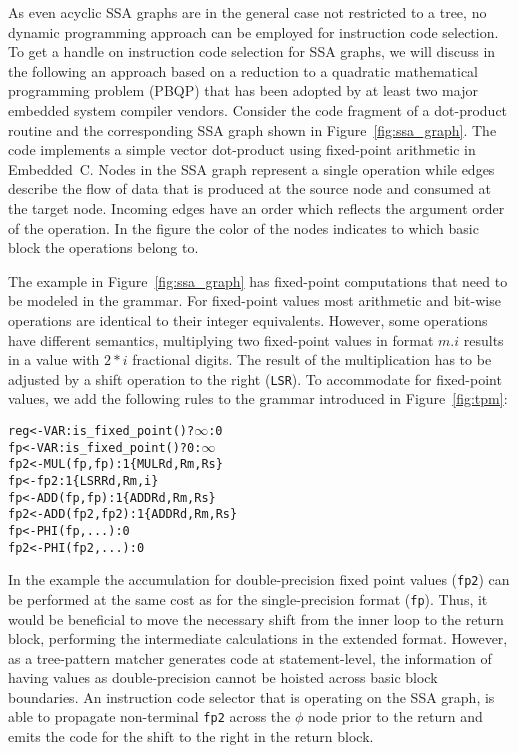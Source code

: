 As even acyclic SSA graphs are in the general case not restricted to a tree, no dynamic programming approach
can be employed for instruction code selection.  To get a handle on instruction code
selection for SSA graphs, we will discuss in the following an approach
based on a reduction to a quadratic mathematical programming problem
(PBQP) that has been adopted by at least two major embedded system
compiler vendors.  Consider the code fragment of a dot-product routine
and the corresponding SSA graph shown in Figure~\ref{fig:ssa_graph}.
The code implements a simple vector dot-product using fixed-point
arithmetic in Embedded~C.  Nodes in the SSA graph represent a single
operation while edges describe the flow of data that is produced at the
source node and consumed at the target node. Incoming edges
have an order which reflects the argument order of the operation. In
the figure the color of the nodes indicates to which basic block the
operations belong to.

The example in Figure~\ref{fig:ssa_graph} has fixed-point computations
that need to be modeled in the grammar. For fixed-point values most
arithmetic and bit-wise operations are identical to their integer
equivalents. However, some operations have different semantics, \eg
multiplying two fixed-point values in format $m.i$ results in a value
with $2*i$ fractional digits. The result of the multiplication has to
be adjusted by a shift operation to the right (\texttt{LSR}). To accommodate for
fixed-point values, we add the following rules to the grammar
introduced in Figure~\ref{fig:tpm}:
\begin{alltt}
   reg <- VAR : is\_fixed_point() ? \(\infty\) : 0
   fp  <- VAR : is\_fixed_point() ? 0 : \(\infty\)
   fp2 <- MUL(fp, fp)   : 1   \{ MUL Rd, Rm, Rs \}
   fp  <- fp2           : 1   \{ LSR Rd, Rm, i  \}
   fp  <- ADD(fp, fp)   : 1   \{ ADD Rd, Rm, Rs \}
   fp2 <- ADD(fp2, fp2) : 1   \{ ADD Rd, Rm, Rs \}
   fp  <- PHI(fp, ...) : 0 
   fp2 <- PHI(fp2, ...) : 0 
\end{alltt}

In the example the accumulation for double-precision fixed
point values (\texttt{fp2}) can be performed at the same cost as for the single-precision format (\texttt{fp}). Thus, it would be
beneficial to move the necessary shift from the inner loop to the
return block, performing the intermediate calculations in the extended
format. However, as a tree-pattern matcher generates code at 
statement-level, the information of having values as double-precision
cannot be hoisted across basic block boundaries.
An instruction code selector that is operating on the SSA graph, is able to propagate 
non-terminal \texttt{fp2} across the $\phi$ node prior to the return 
and emits the code for the shift to the right in the return block.

